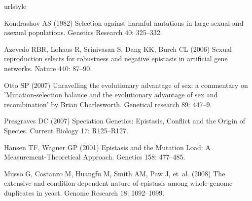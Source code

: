 \documentclass[10pt]{article}
\begin{document}
%
%
% 

\begin{thebibliography}{10}
\providecommand{\url}[1]{\texttt{#1}}
\providecommand{\urlprefix}{URL }
\expandafter\ifx\csname urlstyle\endcsname\relax
  \providecommand{\doi}[1]{doi:\discretionary{}{}{}#1}\else
  \providecommand{\doi}{doi:\discretionary{}{}{}\begingroup
  \urlstyle{rm}\Url}\fi
\providecommand{\bibAnnoteFile}[1]{%
  \IfFileExists{#1}{\begin{quotation}\noindent\textsc{Key:} #1\\
  \textsc{Annotation:}\ \end{quotation}}{}}
\providecommand{\bibAnnote}[2]{%
  \begin{quotation}\noindent\textsc{Key:} #1\\
  \textsc{Annotation:}\ #2\end{quotation}}
\providecommand{\eprint}[2][]{\url{#2}}

Kondrashov AS (1982) {Selection against harmful mutations in large sexual and
  asexual populations}.
\newblock Genetics Research 40: 325--332.

Azevedo RBR, Lohaus R, Srinivasan S, Dang KK, Burch CL (2006) {Sexual
  reproduction selects for robustness and negative epistasis in artificial gene
  networks.}
\newblock Nature 440: 87--90.

Otto SP (2007) {Unravelling the evolutionary advantage of sex: a commentary on
  'Mutation-selection balance and the evolutionary advantage of sex and
  recombination' by Brian Charlesworth.}
\newblock Genetical research 89: 447--9.

Presgraves DC (2007) {Speciation Genetics: Epistasis, Conflict and the Origin
  of Species}.
\newblock Current Biology 17: R125--R127.

Hansen TF, Wagner GP (2001) {Epistasis and the Mutation Load: A
  Measurement-Theoretical Approach}.
\newblock Genetics 158: 477--485.

Musso G, Costanzo M, Huangfu M, Smith AM, Paw J, et~al. (2008) {The extensive
  and condition-dependent nature of epistasis among whole-genome duplicates in
  yeast}.
\newblock Genome Research 18: 1092--1099.


\end{thebibliography}
\end{document}
